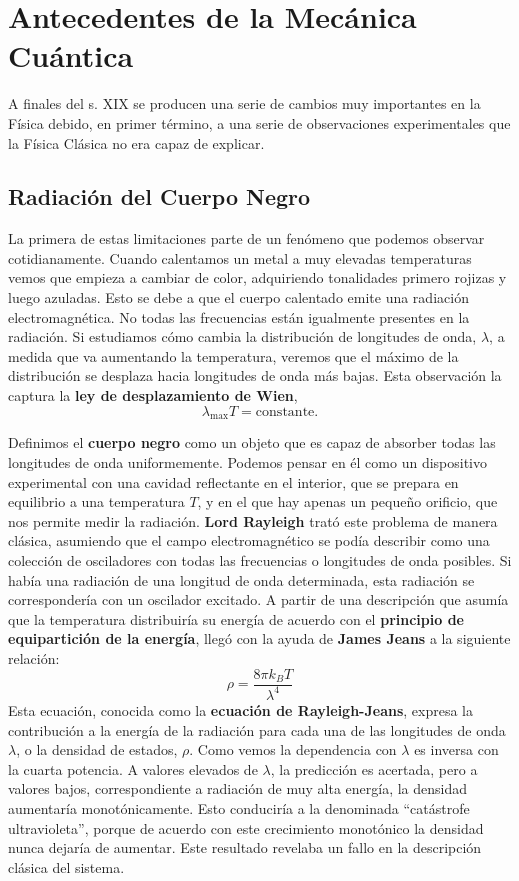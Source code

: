 \chapter{Antecedentes de la Mecánica Cuántica}
A finales del s. XIX se producen una serie de cambios muy 
importantes  en la Física debido, en primer término, a una
serie de observaciones experimentales que la Física Clásica
no era capaz de explicar.

\section{Radiación del Cuerpo Negro}
La primera de estas limitaciones parte de un fenómeno que 
podemos observar cotidianamente. Cuando calentamos un metal 
a muy elevadas temperaturas vemos que empieza a cambiar de 
color, adquiriendo tonalidades primero rojizas y luego azuladas.
Esto se debe a que  el cuerpo calentado emite una radiación
electromagnética. No todas las frecuencias están igualmente 
presentes en la radiación. Si estudiamos cómo cambia la distribución
de longitudes de onda, $\lambda$,  a medida que va aumentando
la temperatura, veremos que el máximo de la distribución se 
desplaza hacia longitudes de onda más bajas. Esta observación la
captura la \textbf{ley de desplazamiento de Wien},
\begin{equation}
\lambda_\mathrm{max}T=\mathrm{constante}.
\label{eq:Wien}
\end{equation}

Definimos el \textbf{cuerpo negro} como un objeto que es capaz de 
absorber todas las longitudes de onda uniformemente. Podemos pensar
en él como un dispositivo experimental con una cavidad reflectante
en el interior, que se prepara en equilibrio a una temperatura $T$,
y en el que hay apenas un pequeño orificio, que nos permite medir 
la radiación. \textbf{Lord Rayleigh} trató este problema de manera
clásica, asumiendo que el campo electromagnético se podía describir
como una colección de osciladores con todas las frecuencias o
longitudes de onda posibles. Si había una radiación de una longitud
de onda determinada, esta radiación se correspondería con un oscilador
excitado. A partir de una descripción que asumía que la temperatura
distribuiría su energía de acuerdo con el \textbf{principio de
equipartición de la energía}, llegó con la ayuda de \textbf{James
Jeans} a la siguiente relación:
\begin{equation}
\rho=\frac{8\pi k_BT}{\lambda^4}
\label{eq:rayleigh-jeans}
\end{equation}
Esta ecuación, conocida como la \textbf{ecuación de Rayleigh-Jeans},
expresa la contribución a la energía de la radiación para cada una de las 
longitudes de onda $\lambda$, o la densidad de estados, $\rho$. 
Como vemos la dependencia con  $\lambda$ es inversa con la
cuarta potencia.  A valores elevados de $\lambda$, la predicción
es acertada, pero a valores bajos, correspondiente a radiación
de muy alta energía, la densidad aumentaría monotónicamente. 
Esto  conduciría a la denominada ``catástrofe 
ultravioleta'', porque de acuerdo con este crecimiento monotónico
la densidad nunca dejaría de aumentar. Este resultado revelaba un
fallo en la descripción clásica del sistema.

